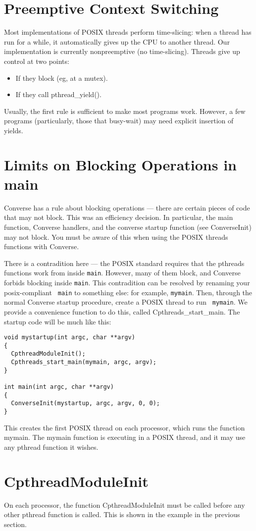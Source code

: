 \section{Preemptive Context Switching}

Most implementations of POSIX threads perform time-slicing: when a thread
has run for a while, it automatically gives up the CPU to another thread.
Our implementation is currently nonpreemptive (no time-slicing).  Threads
give up control at two points:

\begin{itemize}
\item{If they block (eg, at a mutex).}
\item{If they call pthread_yield().}
\end{itemize}

Usually, the first rule is sufficient to make most programs work.
However, a few programs (particularly, those that busy-wait) may need
explicit insertion of yields.

\section{Limits on Blocking Operations in main}

Converse has a rule about blocking operations --- there are certain
pieces of code that may not block.  This was an efficiency decision.
In particular, the main function, Converse handlers, and the converse
startup function (see ConverseInit) may not block.  You must be aware
of this when using the POSIX threads functions with Converse.

There is a contradition here --- the POSIX standard requires that the
pthreads functions work from inside {\tt main}.  However, many of them
block, and Converse forbids blocking inside {\tt main}.  This
contradition can be resolved by renaming your posix-compliant {\tt
main} to something else: for example, {\tt mymain}.  Then, through the
normal Converse startup procedure, create a POSIX thread to run {\tt
mymain}.  We provide a convenience function to do this, called
Cpthreads\_start\_main.  The startup code will be much like this:

\begin{verbatim}
void mystartup(int argc, char **argv)
{
  CpthreadModuleInit();
  Cpthreads_start_main(mymain, argc, argv);
}

int main(int argc, char **argv)
{
  ConverseInit(mystartup, argc, argv, 0, 0);
}
\end{verbatim}

This creates the first POSIX thread on each processor, which runs the
function mymain.  The mymain function is executing in a POSIX thread,
and it may use any pthread function it wishes.

\section{CpthreadModuleInit}

On each processor, the function CpthreadModuleInit must be called
before any other pthread function is called.  This is shown in the
example in the previous section.
